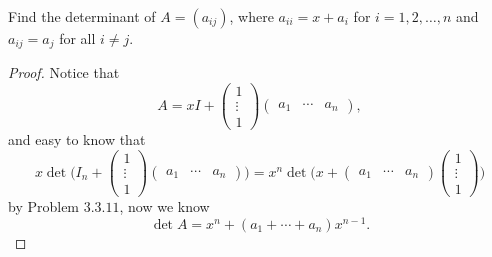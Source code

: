 \begin{pro}%
	Find the determinant of $A=(a_{ij})$, where $a_{ii}=x+a_i$ for $i=1,2,\ldots,n$ and $a_{ij}=a_j$ for all $i\neq j$.
\end{pro}
\begin{proof}
	Notice that
	\[A=xI+\begin{pmatrix}1\\\vdots\\1\end{pmatrix}
	\begin{pmatrix}a_1&\cdots& a_n\end{pmatrix},\]
	and easy to know that
	\[x \det\bigg(I_n+\begin{pmatrix}1\\\vdots\\1\end{pmatrix}
	\begin{pmatrix}a_1&\cdots&a_n\end{pmatrix}\bigg)
	=x^n \det\bigg(x
	+\begin{pmatrix}a_1&\cdots&a_n\end{pmatrix}
	\begin{pmatrix}1\\\vdots\\1\end{pmatrix}\bigg)\]
	by Problem $3.3.11$, now we know
	\[\det A=x^n+(a_1+\cdots+a_n)x^{n-1}.\]
\end{proof}

